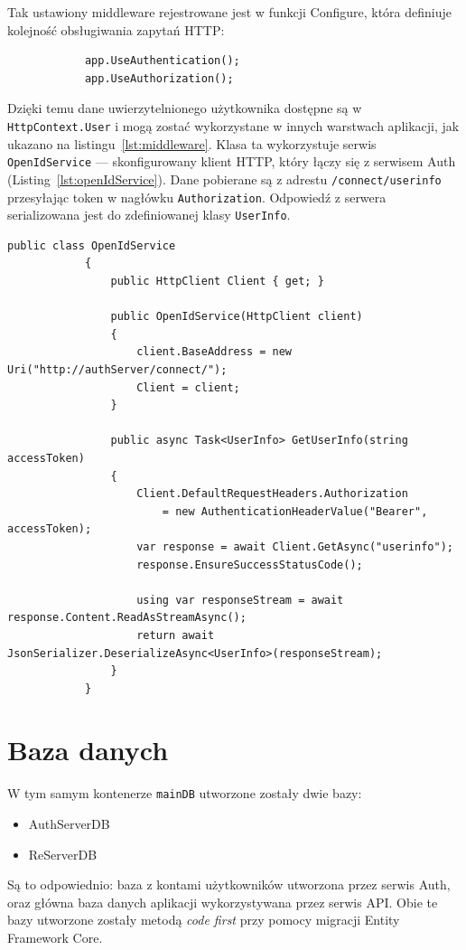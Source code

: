 		Tak ustawiony middleware rejestrowane jest w funkcji Configure, która definiuje kolejność obsługiwania zapytań HTTP:
		\begin{lstlisting}
			app.UseAuthentication();
			app.UseAuthorization();
		\end{lstlisting}
		Dzięki temu dane uwierzytelnionego użytkownika dostępne są w \verb|HttpContext.User| i mogą zostać wykorzystane w innych warstwach aplikacji, jak ukazano na listingu~\ref{lst:middleware}.
		Klasa ta wykorzystuje serwis \verb|OpenIdService| --- skonfigurowany klient HTTP, który łączy się z serwisem Auth (Listing~\ref{lst:openIdService}).
		Dane pobierane są z adrestu \verb|/connect/userinfo| przesyłając token w nagłówku \verb|Authorization|.
		Odpowiedź z serwera serializowana jest do zdefiniowanej klasy \verb|UserInfo|.
		\begin{lstlisting}[label=lst:openIdService, caption=Serwis HTTP pobierający dane użytkownika, float]
			public class OpenIdService
			{
				public HttpClient Client { get; }
		
				public OpenIdService(HttpClient client)
				{
					client.BaseAddress = new Uri("http://authServer/connect/");
					Client = client;
				}
		
				public async Task<UserInfo> GetUserInfo(string accessToken)
				{
					Client.DefaultRequestHeaders.Authorization
						= new AuthenticationHeaderValue("Bearer", accessToken);
					var response = await Client.GetAsync("userinfo");
					response.EnsureSuccessStatusCode();
		
					using var responseStream = await response.Content.ReadAsStreamAsync();
					return await JsonSerializer.DeserializeAsync<UserInfo>(responseStream);
				}
			}
		\end{lstlisting}

\section{Baza danych}
	W tym samym kontenerze \verb|mainDB| utworzone zostały dwie bazy:
	\begin{itemize}
		\item AuthServerDB
		\item ReServerDB
	\end{itemize}
	Są to odpowiednio: baza z kontami użytkowników utworzona przez serwis Auth, oraz główna baza danych aplikacji wykorzystywana przez serwis API.
	Obie te bazy utworzone zostały metodą \emph{code first} przy pomocy migracji Entity Framework Core.

